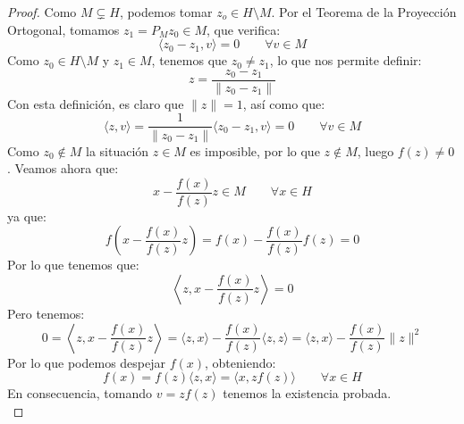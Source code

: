 \begin{teo}
\begin{proof}
        \noindent
        Como $M\subsetneq H$, podemos tomar $z_o\in H\setminus M$. Por el Teorema de la Proyección Ortogonal, tomamos $z_1 = P_Mz_0 \in M$, que verifica:
        \begin{equation*}
            \langle z_0 - z_1, v \rangle  = 0 \qquad \forall v\in M
        \end{equation*}
        Como $z_0\in H\setminus M$ y $z_1 \in M$, tenemos que $z_0 \neq z_1$, lo que nos permite definir:
        \begin{equation*}
            z = \dfrac{z_0 - z_1}{\|z_0 - z_1\|}
        \end{equation*}
        Con esta definición, es claro que $\|z\| = 1$, así como que:
        \begin{equation*}
            \langle z,v \rangle = \dfrac{1}{\|z_0 - z_1\|}\langle z_0 - z_1,v \rangle  = 0 \qquad \forall v\in M
        \end{equation*}
        Como $z_0 \notin M$ la situación $z\in M$ es imposible, por lo que $z\notin M$, luego $f(z) \neq 0$. Veamos ahora que:
        \begin{equation*}
            x-\dfrac{f(x)}{f(z)}z \in M \qquad \forall x\in H
        \end{equation*}
        ya que:
        \begin{equation*}
            f\left(x-\dfrac{f(x)}{f(z)}z\right) = f(x) - \dfrac{f(x)}{f(z)}f(z) = 0
        \end{equation*}
        Por lo que tenemos que:
        \begin{equation*}
            \left\langle z,x-\dfrac{f(x)}{f(z)}z \right\rangle  = 0
        \end{equation*}
        Pero tenemos:
        \begin{equation*}
            0 = \left\langle z,x-\dfrac{f(x)}{f(z)}z \right\rangle  = \langle z,x \rangle - \dfrac{f(x)}{f(z)} \langle z,z \rangle  = \langle z,x \rangle  - \dfrac{f(x)}{f(z)} \|z\|^2
        \end{equation*}
        Por lo que podemos despejar $f(x)$, obteniendo:
        \begin{equation*}
            f(x) = f(z)\langle z,x \rangle = \langle x,zf(z) \rangle   \qquad \forall x\in H
        \end{equation*}
        En consecuencia, tomando $v = zf(z)$ tenemos la existencia probada.\\


\end{proof}
\end{teo}
